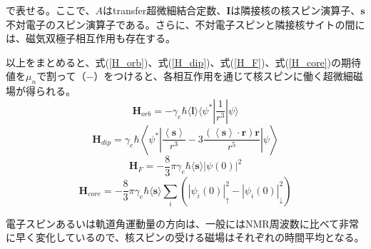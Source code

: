 \documentclass[11pt,a4j]{jreport}
\begin{document}
で表せる。ここで、$A$はtransfer超微細結合定数、$\bm I$は隣接核の核スピン演算子、$\bm s$不対電子のスピン演算子である。さらに、不対電子スピンと隣接核サイトの間には、磁気双極子相互作用も存在する。\par
以上をまとめると、式(\ref{H_orb})、式(\ref{H_dip})、式(\ref{H_F})、式(\ref{H_core})の期待値を$\mu_n$で割って（$-$）をつけると、各相互作用を通じて核スピンに働く超微細磁場が得られる。
\begin{equation}
  \bm{H}_{orb} = -\gamma_e\hbar \langle \bm{l} \rangle \langle \psi^*|\frac{1}{r^3}|\psi \rangle 
\end{equation}
\begin{equation}
  \bm{H}_{dip} = \gamma_e\hbar \left\langle \psi^* \left|\frac{\left\langle\bm{s}\right\rangle}{r^3}-3\frac{(\left\langle \bm s\right\rangle \cdot \bm r)\bm{r} }{r^5} \right| \psi \right\rangle
\end{equation}
\begin{equation}
  \bm{H}_F = -\frac{8}{3}\pi \gamma_e \hbar \langle \bm{s}\rangle |\psi(0)|^2
  \label{H_F_2}
\end{equation}
\begin{equation}
  \bm{H}_{core} = -\frac{8}{3}\pi \gamma_e \hbar \langle \bm{s}\rangle \sum_{i}{(|\psi_i(0)|_\uparrow^2-|\psi_i(0)|_\downarrow^2 )}
\end{equation}
\par
電子スピンあるいは軌道角運動量の方向は、一般にはNMR周波数に比べて非常に早く変化しているので、核スピンの受ける磁場はそれぞれの時間平均となる。
\end{document}
